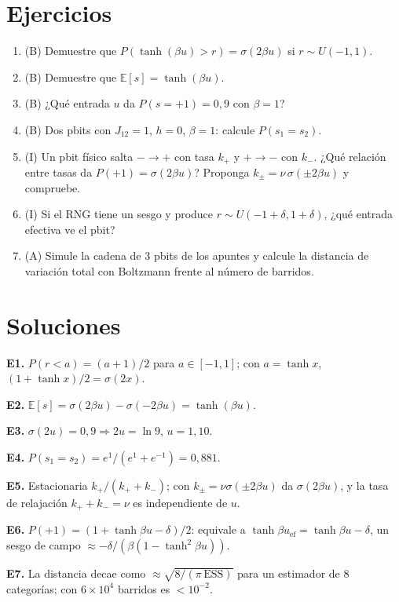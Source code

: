 \documentclass[11pt,a4paper]{article}
\begin{document}
\section{Ejercicios}
\begin{enumerate}[label=\textbf{E\arabic*.}]
\item (B) Demuestre que $P(\tanh(\beta u)>r)=\sigma(2\beta u)$ si $r\sim U(-1,1)$.
\item (B) Demuestre que $\mathbb E[s]=\tanh(\beta u)$.
\item (B) ¿Qué entrada $u$ da $P(s=+1)=0{,}9$ con $\beta=1$?
\item (B) Dos pbits con $J_{12}=1$, $h=0$, $\beta=1$: calcule $P(s_1=s_2)$.
\item (I) Un pbit físico salta $-\to+$ con tasa $k_+$ y $+\to-$ con $k_-$. ¿Qué relación entre tasas da $P(+1)=\sigma(2\beta u)$? Proponga
$k_\pm=\nu\,\sigma(\pm2\beta u)$ y compruebe.
\item (I) Si el RNG tiene un sesgo y produce $r\sim U(-1+\delta,1+\delta)$, ¿qué entrada efectiva ve el pbit?
\item (A) Simule la cadena de 3 pbits de los apuntes y calcule la distancia de variación total con Boltzmann frente al número de barridos.
\end{enumerate}
\section{Soluciones}
\begin{solucion}
\textbf{E1.} $P(r<a)=(a+1)/2$ para $a\in[-1,1]$; con $a=\tanh x$, $(1+\tanh x)/2=\sigma(2x)$.

\textbf{E2.} $\mathbb E[s]=\sigma(2\beta u)-\sigma(-2\beta u)=\tanh(\beta u)$.

\textbf{E3.} $\sigma(2u)=0{,}9\Rightarrow2u=\ln9$, $u=1{,}10$.

\textbf{E4.} $P(s_1=s_2)=e^{1}/(e^1+e^{-1})=0{,}881$.

\textbf{E5.} Estacionaria $k_+/(k_++k_-)$; con $k_\pm=\nu\sigma(\pm2\beta u)$ da $\sigma(2\beta u)$, y la tasa de relajación $k_++k_-=\nu$ es independiente de $u$.

\textbf{E6.} $P(+1)=(1+\tanh\beta u-\delta)/2$: equivale a $\tanh\beta u_{\text{ef}}=\tanh\beta u-\delta$, un sesgo de campo $\approx-\delta/(\beta(1-\tanh^2\beta u))$.

\textbf{E7.} La distancia decae como $\approx\sqrt{8/(\pi\,\mathrm{ESS})}$ para un estimador de 8 categorías; con $6\times10^4$ barridos es $<10^{-2}$.
\end{solucion}
\end{document}

